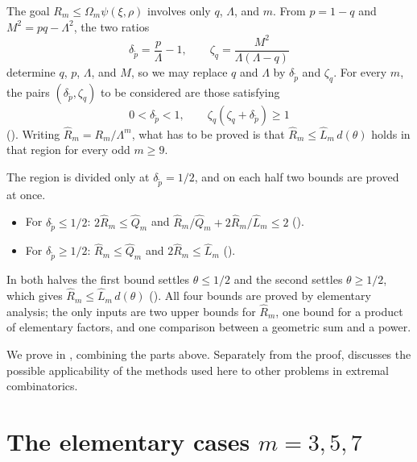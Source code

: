 ﻿\documentclass[11pt]{article}
\numberwithin{equation}{section}
\begin{document}
\begin{enumerate}[label=\textbf{Section \arabic*.},leftmargin=4.6em,start=2]
  The goal $R_m\le \Omega_m\psi(\xi,\rho)$ involves only $q$, $\Lambda$, and $m$.
  From $p=1-q$ and $M^2=pq-\Lambda^2$, the two ratios
  \[
    \delta_{\tilde p}=\frac {p}{\Lambda}-1,
    \qquad
    \zeta_q=\frac{M^2}{\Lambda(\Lambda-q)}
  \]
  determine $q$, $p$, $\Lambda$, and $M$, so we may replace $q$ and $\Lambda$ by $\delta_{\tilde p}$ and $\zeta_q$.
  For every $m$, the pairs $(\delta_{\tilde p},\zeta_q)$ to be considered are those satisfying
  \[
    0<\delta_{\tilde p}<1,
    \qquad
    \zeta_q(\zeta_q+\delta_{\tilde p})\ge1
  \]
  ().
  Writing $\widehat R_m=R_m/\Lambda^m$, what has to be proved is that $\widehat R_m\le\widehat L_m\,d(\theta)$ holds in that region for every odd $m\ge9$.

  The region is divided only at $\delta_{\tilde p}=1/2$, and on each half two bounds are proved at once.
  \begin{itemize}[leftmargin=1.6em,topsep=2pt,itemsep=1pt]
    \item For $\delta_{\tilde p}\le1/2$: $2\widehat R_m\le\widehat Q_m$ and $\widehat R_m/\widehat Q_m+2\widehat R_m/\widehat L_m\le2$ ().
    \item For $\delta_{\tilde p}\ge1/2$: $\widehat R_m\le\widehat Q_m$ and $2\widehat R_m\le\widehat L_m$ ().
  \end{itemize}
  In both halves the first bound settles $\theta\le1/2$ and the second settles $\theta\ge1/2$, which gives $\widehat R_m\le\widehat L_m\,d(\theta)$ ().
  All four bounds are proved by elementary analysis; the only inputs are two upper bounds for $\widehat R_m$, one bound for a product of elementary factors, and one comparison between a geometric sum and a power.
\end{enumerate}

We prove  in , combining the parts above.
Separately from the proof,  discusses the possible applicability of the methods used here to other problems in extremal combinatorics.

\section{The elementary cases \texorpdfstring{$m=3,5,7$}{m=3,5,7}}\label{sec:short-cycles}
\end{document}
